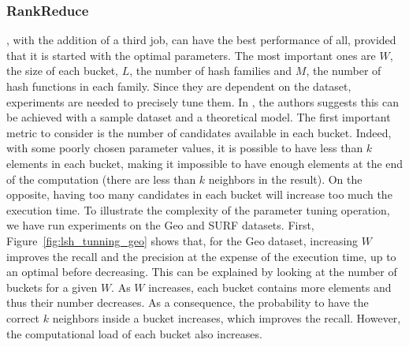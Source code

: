 \subsubsection{RankReduce}\label{rankreduceanalysis}
\LSH, with the addition of a third job, can have the best performance of all, provided that it is started with the 
optimal parameters.
The most important ones are $W$, the size of each bucket, $L$, the number of hash families and $M$, the number 
of hash functions in each family. Since they are dependent on the dataset, experiments are 
needed to precisely tune them. In \cite{Dong:2008:MLP:1458082.1458172_full}, the authors suggests this can be achieved 
with a sample dataset and a theoretical model. 
The first important metric to consider is the number of candidates available in each bucket. Indeed, with some 
poorly chosen parameter values, it is possible to have less than $k$ elements in each bucket, making it impossible to 
have enough elements at the end of the computation (there are less than $k$ neighbors in the result). On the opposite, 
having too many candidates in each bucket will increase too much the execution time. 
To illustrate the complexity of the parameter tuning operation, we have run experiments on the Geo and SURF datasets. 
First, Figure~\ref{fig:lsh_tunning_geo} shows that, for the Geo dataset, increasing $W$ improves the recall and the 
precision at the expense of the execution time, up to an optimal before decreasing. This can be explained by looking
at the number of buckets for a given $W$. As $W$ increases, each bucket contains more elements and thus their number 
decreases. As a consequence, the probability to have the correct $k$ neighbors inside a bucket increases, which 
improves the recall. However, the computational load of each bucket also increases.

